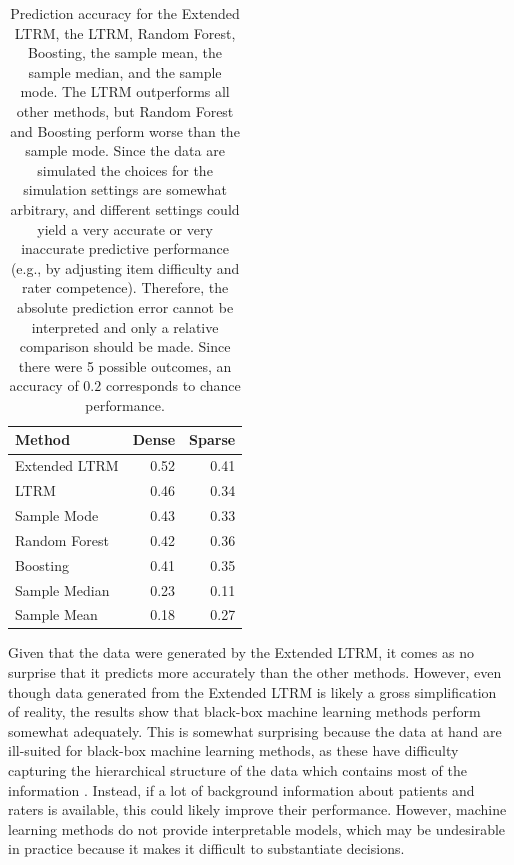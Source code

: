 \documentclass[a4paper,usenames,dvipsnames]{article}
\newenvironment{revision}{\color{teal}}{\color{black}}
\begin{document}
\begin{table}[ht]
	\centering
	\caption{Prediction accuracy for the \begin{revision}Extended LTRM, the\end{revision} LTRM, Random Forest, Boosting, \begin{revision}the sample mean, the sample median, \end{revision}and the sample mode. The LTRM outperforms all other methods, but Random Forest and Boosting perform worse than the sample mode. Since the data are simulated the choices for the simulation settings are somewhat arbitrary, and different settings could yield a very accurate or very inaccurate predictive performance (e.g., by adjusting item difficulty and rater competence). Therefore, the absolute prediction error cannot be interpreted and only a relative comparison should be made. Since there were 5 possible outcomes, an accuracy of $0.2$ corresponds to chance performance.}
	\begin{tabular}{lrr}
		\toprule
		Method & Dense & Sparse \\ 
		\midrule
		Extended LTRM & 0.52 & 0.41 \\ 
		LTRM & 0.46 & 0.34 \\ 
		Sample Mode & 0.43 & 0.33 \\ 
		Random Forest & 0.42 & 0.36 \\ 
		Boosting & 0.41 & 0.35 \\ 
		Sample Median & 0.23 & 0.11 \\ 
		Sample Mean & 0.18 & 0.27 \\ 
		\bottomrule
	\end{tabular}
\end{table}
Given that the data were generated by the \begin{revision}Extended \end{revision}LTRM, it comes as no surprise that it predicts more accurately than the other methods. However, even though data generated from the \begin{revision}Extended \end{revision}LTRM is likely a gross simplification of reality, the results show that black-box machine learning methods perform somewhat adequately. This is somewhat surprising because the data at hand are ill-suited for black-box machine learning methods, as these have difficulty capturing the hierarchical structure of the data which contains most of the information \cite<but see>{hajjem2014mixed}. Instead, if a lot of background information about patients and raters is available, this could likely improve their performance. However, machine learning methods do not provide interpretable models, which may be undesirable in practice because it makes it difficult to substantiate decisions.
\end{document}
